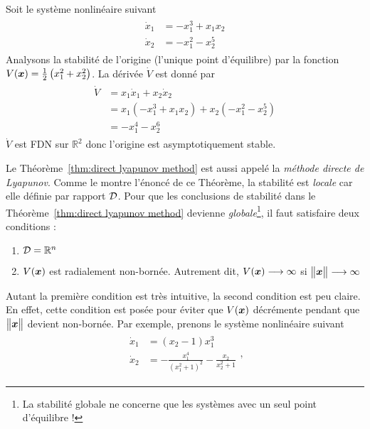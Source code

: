 \begin{example}
	Soit le système nonlinéaire suivant 
	\begin{align}
		\begin{split}
			\dot{x}_1 &=-x_1^3 + x_1x_2\\
			\dot{x}_2 &=-x_1^2 -x_2^5
		\end{split}
	\end{align}
	Analysons la stabilité de l'origine (l'unique point d'équilibre) par la fonction $V(\bm{x})=\frac{1}{2}\left(x_1^2+x_2^2\right)$. La dérivée $\dot{V}$ est donné par 
	\begin{align}
		\begin{split}
			\dot{V}&=x_1\dot{x}_1 + x_2\dot{x}_2\\
			&=x_1\left(-x_1^3 + x_1x_2\right) + x_2\left(-x_1^2 -x_2^5\right) \\
			&= -x_1^4-x_2^6
		\end{split}
	\end{align}
	$\dot{V}$ est FDN sur $\mathbb{R}^2$ donc l'origine est asymptotiquement stable.
\end{example}
Le Théorème~\ref{thm:direct lyapunov method} est aussi appelé la \emph{méthode directe de Lyapunov}. Comme le montre l'énoncé de ce Théorème, la stabilité est \emph{locale} car elle définie par rapport $ {\cal D}$. Pour que les conclusions de stabilité dans le Théorème~\ref{thm:direct lyapunov method} devienne \emph{globale}\footnote{La stabilité globale ne concerne que les systèmes avec un seul point d'équilibre !}, il faut satisfaire deux conditions : 
\begin{enumerate}
	\item ${\cal D}=\mathbb{R}^n$
	\item $V(\bm{x})$ est radialement non-bornée. Autrement dit, $V(\bm{x})\longrightarrow\infty$ si  $\begin{Vmatrix} \bm{x} \end{Vmatrix}\longrightarrow\infty$
\end{enumerate}
Autant la première condition est très intuitive, la second condition est peu claire. En effet, cette condition est posée pour éviter que $V(\bm{x})$ décrémente pendant que $\begin{Vmatrix} \bm{x} \end{Vmatrix}$ devient non-bornée. Par exemple, prenons le système nonlinéaire suivant 
\begin{align}\label{eq-chap2:example of nonglobal stable system}
	\begin{split}
		\dot{x}_1 &=(x_2-1)x_1^3\\
		\dot{x}_2 &=-\frac{x_1^4}{(x_1^2+1)^2}-\frac{x_2}{x_2^2+1}
	\end{split},
\end{align}
